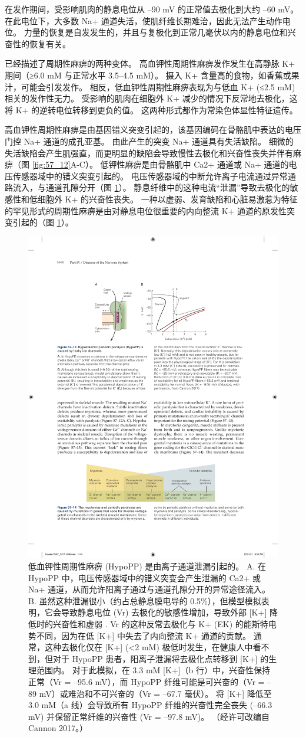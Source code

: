 在发作期间，受影响肌肉的静息电位从 –90 mV 的正常值去极化到大约 –60 mV。
在此电位下，大多数 Na+ 通道失活，使肌纤维长期难治，因此无法产生动作电位。
力量的恢复是自发发生的，并且与复极化到正常几毫伏以内的静息电位和兴奋性的恢复有关。


已经描述了周期性麻痹的两种变体。
高血钾性周期性麻痹发作发生在高静脉 K+ 期间（≥6.0 mM 与正常水平 3.5–4.5 mM）。
摄入 K+ 含量高的食物，如香蕉或果汁，可能会引发发作。
相反，低血钾性周期性麻痹表现为与低血 K+ (≤2.5 mM) 相关的发作性无力。
受影响的肌肉在细胞外 K+ 减少的情况下反常地去极化，这将 K+ 的逆转电位转移到更负的值。
这两种形式都作为常染色体显性特征遗传。


高血钾性周期性麻痹是由基因错义突变引起的，该基因编码在骨骼肌中表达的电压门控 Na+ 通道的成孔亚基。
由此产生的突变 Na+ 通道具有失活缺陷。
细微的失活缺陷会产生肌强直，而更明显的缺陷会导致慢性去极化和兴奋性丧失并伴有麻痹（图 \ref{fig:57_12}A-C）。
低钾性麻痹是由骨骼肌中 Ca2+ 通道或 Na+ 通道的电压传感器域中的错义突变引起的。
电压传感器域的中断允许离子电流通过异常通路流入，与通道孔隙分开（图 \ref{fig:57_13}）。
静息纤维中的这种电流“泄漏”导致去极化的敏感性和低细胞外 K+ 的兴奋性丧失。
一种以虚弱、发育缺陷和心脏易激惹为特征的罕见形式的周期性麻痹是由对静息电位很重要的内向整流 K+ 通道的原发性突变引起的（图 \ref{fig:57_13}）。


\begin{figure}[htbp]
	\centering
	\includegraphics[width=0.6\linewidth]{chap57/fig_57_13}
	\caption{低血钾性周期性麻痹 (HypoPP) 是由离子通道泄漏引起的。 A. 在 HypoPP 中，电压传感器域中的错义突变会产生泄漏的 Ca2+ 或 Na+ 通道，从而允许阳离子通过与通道孔隙分开的异常途径流入。 B. 虽然这种泄漏很小（约占总静息膜电导的 0.5\%），但模型模拟表明，它会导致静息电位 (Vr) 去极化的敏感性增加，导致外部 [K+] 降低时的兴奋性和虚弱 . Vr 的这种反常去极化与 K+ (EK) 的能斯特电势不同，因为在低 [K+] 中失去了内向整流 K+ 通道的贡献。 通常，这种去极化仅在 [K+] (<2 mM) 极低时发生，在健康人中看不到，但对于 HypoPP 患者，阳离子泄漏将去极化点转移到 [K+] 的生理范围内。 对于此模拟，在 3.3 mM [K+]（b 行）中，兴奋性保持正常（Vr = –95.6 mV），而 HypoPP 纤维可能是可兴奋的（Vr = –89 mV）或难治和不可兴奋的（Vr = –67.7 毫伏）。 将 [K+] 降低至 3.0 mM（a 线）会导致所有 HypoPP 纤维的兴奋性完全丧失 (–66.3 mV) 并保留正常纤维的兴奋性 (Vr = –97.8 mV)。 （经许可改编自 Cannon 2017。）}
	\label{fig:57_13}
\end{figure}


